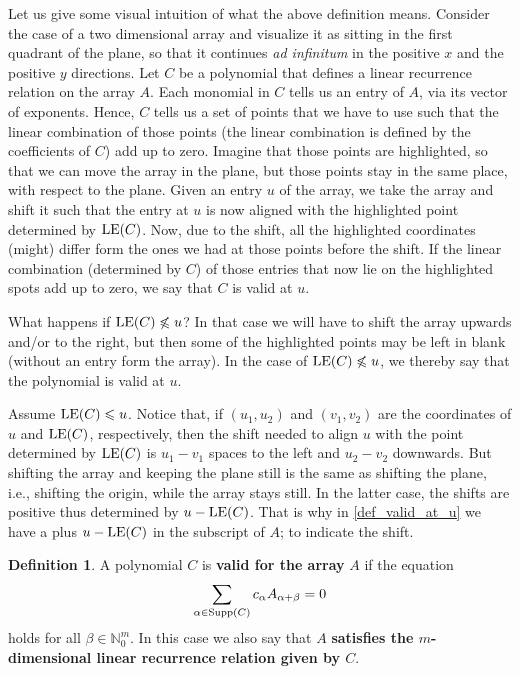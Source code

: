 \documentclass[12pt]{article}
\renewcommand{\le}{\textup{LE}}
\newcommand{\supp}{\textup{Supp}}
\theoremstyle{definition}
\newtheorem{definition}[theorem]{Definition}
\theoremstyle{definition}
\theoremstyle{definition}
\theoremstyle{plain}
\theoremstyle{plain}
\numberwithin{equation}{section}
\begin{document}
Let us give some visual intuition of what the above definition means. 
Consider the case of a two dimensional array and visualize it as sitting in the first quadrant of the plane, so that it continues \textit{ad infinitum} in the positive $x$ and the positive $y$ directions. 
Let $C$ be a polynomial that defines a linear recurrence relation on the array $A$. 
Each monomial in $C$ tells us an entry of $A$, via its vector of exponents. 
Hence, $C$ tells us a set of points that we have to use such that the linear combination of those points (the linear combination is defined by the coefficients of $C$) add up to zero.
Imagine that those points are highlighted, so that we can move the array in the plane, but those points stay in the same place, with respect to the plane. 
Given an entry $u$ of the array, we take the array and shift it such that the entry at $u$ is now aligned with the highlighted point determined by $\le(C)$. 
Now, due to the shift, all the highlighted coordinates (might) differ form the ones we had at those points before the shift. 
If the linear combination (determined by $C$) of those entries that now lie on the highlighted spots add up to zero, we say that $C$ is valid at $u$.

What happens if $\le(C) \not\leqslant u$? 
In that case we will have to shift the array upwards and/or to the right, but then some of the highlighted points may be left in blank (without an entry form the array). 
In the case of $\le(C) \not\leqslant u$, we thereby say that the polynomial is valid at $u$.

Assume $\le(C) \leqslant u$. 
Notice that, if $(u_1,u_2)$ and $(v_1,v_2)$ are the coordinates of $u$ and $\le(C)$, respectively, then the shift needed to align $u$ with the point determined by $\le(C)$ is $u_1 - v_1$ spaces to the left and $u_2 - v_2$ downwards. 
But shifting the array and keeping the plane still is the same as shifting the plane, i.e., shifting the origin, while the array stays still. 
In the latter case, the shifts are positive thus determined by $u-\le(C)$. 
That is why in \cref{def_valid_at_u} we have a plus $u-\le(C)$ in the subscript of $A$; to indicate the shift.


\begin{definition}
    A polynomial $C$ is \textbf{valid for the array} $A$ if the equation
    \[
        \sum_{\alpha\in\supp(C)} c_\alpha A_{\alpha+\beta} = 0
    \]
    holds for all $\beta \in \mathbb{N}_0^m$. 
    In this case we also say that $A$ \textbf{satisfies the $m$-dimensional linear recurrence relation given by $C$}. 
\end{definition}
\end{document}
